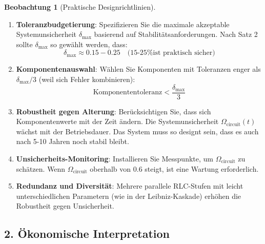 \documentclass[a4paper,12pt,twoside]{report}
\theoremstyle{definition}
\newtheorem{beobachtung}{Beobachtung}
\begin{document}
\begin{beobachtung}[Praktische Designrichtlinien]

\begin{enumerate}
    \item \textbf{Toleranzbudgetierung}: Spezifizieren Sie die maximale akzeptable Systemunsicherheit $\delta_{\max}$ basierend auf Stabilitätsanforderungen. Nach Satz 2 sollte $\delta_{\max}$ so gewählt werden, dass:
    \begin{equation}
    \delta_{\max} \approx 0.15 - 0.25 \quad \text{(15-25\% ist praktisch sicher)}
    \end{equation}
    
    \item \textbf{Komponentenauswahl}: Wählen Sie Komponenten mit Toleranzen enger als $\delta_{\max}/3$ (weil sich Fehler kombinieren):
    \begin{equation}
    \text{Komponententoleranz} < \frac{\delta_{\max}}{3}
    \end{equation}
    
    \item \textbf{Robustheit gegen Alterung}: Berücksichtigen Sie, dass sich Komponentenwerte mit der Zeit ändern. Die Systemunsicherheit $\Omega_{\text{circuit}}(t)$ wächst mit der Betriebsdauer. Das System muss so designt sein, dass es auch nach 5-10 Jahren noch stabil bleibt.
    
    \item \textbf{Unsicherheits-Monitoring}: Installieren Sie Messpunkte, um $\Omega_{\text{circuit}}$ zu schätzen. Wenn $\Omega_{\text{circuit}}$ oberhalb von 0.6 steigt, ist eine Wartung erforderlich.
    
    \item \textbf{Redundanz und Diversität}: Mehrere parallele RLC-Stufen mit leicht unterschiedlichen Parametern (wie in der Leibniz-Kaskade) erhöhen die Robustheit gegen Unsicherheit.
\end{enumerate}

\end{beobachtung}

\subsection{2. Ökonomische Interpretation}
\end{document}
